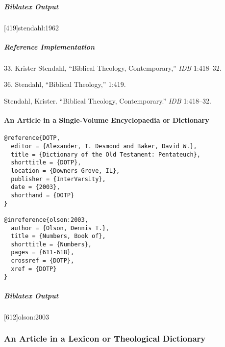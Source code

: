 \documentclass[a4paper]{article}
\newenvironment{biboutput}{%
  \subparagraph{Biblatex Output}
}{\color{black}}
\newenvironment{refimp}{%
  \subparagraph{Reference Implementation}
  \color{reference-colour}
  \rm
}{\par\color{black}}
\begin{document}
\begin{biboutput}
  [419]{stendahl:1962}
  \toggletrue{fullbibrefs}
  \togglefalse{fullbibrefs}
\end{biboutput}

\begin{refimp}
  \hspace*{\bibindent}33. Krister Stendahl, “Biblical Theology, Contemporary,”
  \emph{IDB} 1:418–32.
  
  \hspace*{\bibindent}36. Stendahl, “Biblical Theology,” 1:419.
  
  Stendahl, Krister. “Biblical Theology, Contemporary.” \emph{IDB} 1:418–32.

\end{refimp}

\paragraph{An Article in a Single-Volume Encyclopaedia or Dictionary}

\begin{lstlisting}
@reference{DOTP,
  editor = {Alexander, T. Desmond and Baker, David W.},
  title = {Dictionary of the Old Testament: Pentateuch},
  shorttitle = {DOTP},
  location = {Downers Grove, IL},
  publisher = {InterVarsity},
  date = {2003},
  shorthand = {DOTP}
}

@inreference{olson:2003,
  author = {Olson, Dennis T.},
  title = {Numbers, Book of},
  shorttitle = {Numbers},
  pages = {611-618},
  crossref = {DOTP},
  xref = {DOTP}
}
\end{lstlisting}  

\begin{biboutput}
  [612]{olson:2003}
\end{biboutput}

\subsubsection{An Article in a Lexicon or Theological Dictionary}
\end{document}
